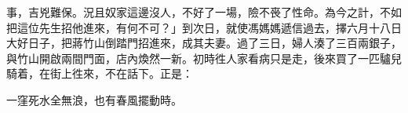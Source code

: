 事，吉兇難保。{}況且奴家這邊沒人，不好了一場，險不䘮了性命。為今之計，不如把這位先生招他進來，有何不可？」到次日，就使馮媽媽遞信過去，擇六月十八日大好日子，把蔣竹山倒踏門招進來，成其夫妻。過了三日，婦人湊了三百兩銀子，與竹山開啟兩間門面，店內煥然一新。初時徃人家看病只是走，後來買了一匹驢兒騎着，在街上徃來，不在話下。正是：

一窪死水全無浪，也有春風擺動時。

